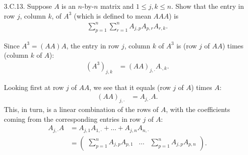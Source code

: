 \documentclass[a5paper]{article}
\begin{document}
\newcommand   \C           {\mathbf{C}}
\newcommand   \R           {\mathbf{R}}
\renewcommand \L           {\mathcal{L}}
\newcommand   \F           {\mathbf{F}}
\renewcommand \P           {\mathcal{P}}
\newcommand   \M           {\mathcal{M}}
\newcommand   \op          {\operatorname}


    3.C.13.
    Suppose $A$ is an $n$-by-$n$ matrix and $1 \le j,k \le n$.
    Show that the entry in row $j$, column $k$, of $A^3$ (which is defined to mean $AAA$) is
\begin{align*}
        \sum_{p=1}^n \sum_{r=1}^n A_{j,p} A_{p,r} A_{r,k} .
\end{align*}

%

    Since $A^3 = (AA)A$, the entry in row $j$, column $k$ of $A^3$ is (row $j$ of $AA$) times (column $k$ of $A$):
\begin{align*}
        (A^3)_{j,k} &= (AA)_{j,\cdot} A_{\cdot,k} .
\end{align*}

    Looking first at row $j$ of $AA$, we see that it equals (row $j$ of $A$) times $A$:
\begin{align*}
        (AA)_{j,\cdot} &= A_{j,\cdot} A .
\end{align*}
    This, in turn, is a linear combination of the rows of $A$, with the coefficients coming from the corresponding entries in row $j$ of $A$:
\begin{align*}
        A_{j,\cdot} A &= A_{j,1}A_{1,\cdot} + \dots + A_{j,n}A_{n,\cdot} \\
                      &= \begin{pmatrix} \sum_{p=1}^nA_{j,p}A_{p,1} & \dots & \sum_{p=1}^nA_{j,p}A_{p,n} \end{pmatrix} .
\end{align*}
\end{document}
